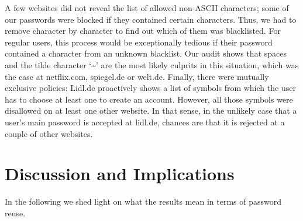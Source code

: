 A few websites did not reveal the list of allowed non-ASCII characters; some of our passwords were blocked if they contained certain characters. Thus, we had to remove character by character to find out which of them was blacklisted. For regular users, this process would be exceptionally tedious if their password contained a character from an unknown blacklist. Our audit shows that spaces and the tilde character `\textasciitilde' are the most likely culprits in this situation, which was the case at netflix.com, spiegel.de or welt.de. Finally, there were mutually exclusive policies: Lidl.de proactively shows a list of symbols from which the user has to choose at least one to create an account. However, all those symbols were disallowed on at least one other website. In that sense, in the unlikely case that a user's main password is accepted at lidl.de, chances are that it is rejected at a couple of other websites. 



\section{Discussion and Implications}
In the following we shed light on what the results mean in terms of password reuse. 
